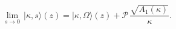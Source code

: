 \begin{equation}
\lim_{s\to 0}\,|\kappa,s\rangle(z)=
|\kappa,\Omega\rangle(z)+\mathscr{P}\,\frac{\sqrt{A_1(\kappa)}}{\kappa}.
\end{equation}

